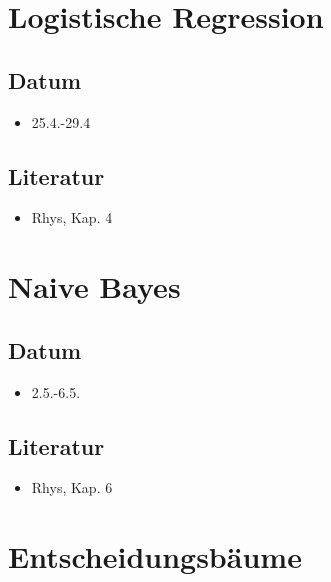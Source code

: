 \documentclass[
]{book}
\providecommand{\tightlist}{%
  \setlength{\itemsep}{0pt}\setlength{\parskip}{0pt}}
\begin{document}
\hypertarget{logistische-regression}{%
\section{Logistische Regression}\label{logistische-regression}}

\hypertarget{datum-6}{%
\subsection{Datum}\label{datum-6}}

\begin{itemize}
\tightlist
\item
  25.4.-29.4
\end{itemize}

\hypertarget{literatur-6}{%
\subsection{Literatur}\label{literatur-6}}

\begin{itemize}
\tightlist
\item
  Rhys, Kap. 4
\end{itemize}

\hypertarget{naive-bayes}{%
\section{Naive Bayes}\label{naive-bayes}}

\hypertarget{datum-7}{%
\subsection{Datum}\label{datum-7}}

\begin{itemize}
\tightlist
\item
  2.5.-6.5.
\end{itemize}

\hypertarget{literatur-7}{%
\subsection{Literatur}\label{literatur-7}}

\begin{itemize}
\tightlist
\item
  Rhys, Kap. 6
\end{itemize}

\hypertarget{entscheidungsbuxe4ume}{%
\section{Entscheidungsbäume}\label{entscheidungsbuxe4ume}}
\end{document}
